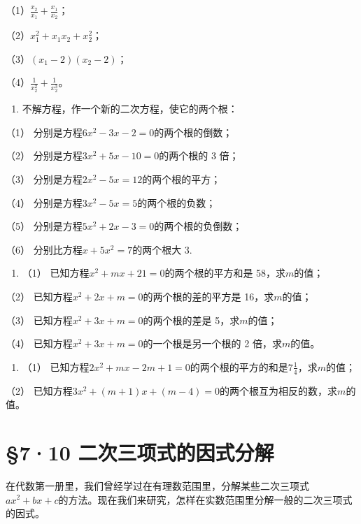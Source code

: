（1）\(\frac{x_2}{x_1} + \frac{x_1}{x_2}\)；

（2）\(x_{1}^{2} + x_{1}x_{2} + x_{2}^{2}\)；

（3）\((x_{1} - 2)(x_{2} - 2)\)；

（4）\(\frac{1}{x_2^2} + \frac{1}{x_2^3}\)。

\begin{enumerate}[start=2]
\item
  不解方程，作一个新的二次方程，使它的两个根：
\end{enumerate}

（1） 分别是方程\(6x^{2}-3x-2=0\)的两个根的倒数；

（2） 分别是方程\(3x^{2}+5x-10=0\)的两个根的 3 倍；

（3） 分别是方程\(2x^{2}-5x=12\)的两个根的平方；

（4） 分别是方程\(3x^{2}-5x=5\)的两个根的负数；

（5） 分别是方程\(5x^{2}+2x-3=0\)的两个根的负倒数；

（6） 分别比方程\(x + 5x^{2} = 7\)的两个根大 3.

\begin{enumerate}[start=3]
\item
  （1） 已知方程\(x^{2} + mx + 21 = 0\)的两个根的平方和是
  58，求\(m\)的值；
\end{enumerate}

（2） 已知方程\(x^{2} + 2x + m = 0\)的两个根的差的平方是
16，求\(m\)的值；

（3） 已知方程\(x^{2} + 3x + m = 0\)的两个根的差是 5，求\(m\)的值；

（4） 已知方程\(x^{2} + 3x + m = 0\)的一个根是另一个根的 2
倍，求\(m\)的值。

\begin{enumerate}[start=4]
\item
  （1）
  已知方程\(2x^{2} + mx - 2m + 1 = 0\)的两个根的平方的和是\(7\frac{1}{4}\)，求\(m\)的值；
\end{enumerate}

（2）
已知方程\(3x^{2} + (m + 1)x + (m - 4) = 0\)的两个根互为相反的数，求\(m\)的值。

\section{§7·10 二次三项式的因式分解}

在代数第一册里，我们曾经学过在有理数范围里，分解某些二次三项式\(ax^2 + bx + c\)的方法。现在我们来研究，怎样在实数范围里分解一般的二次三项式的因式。

